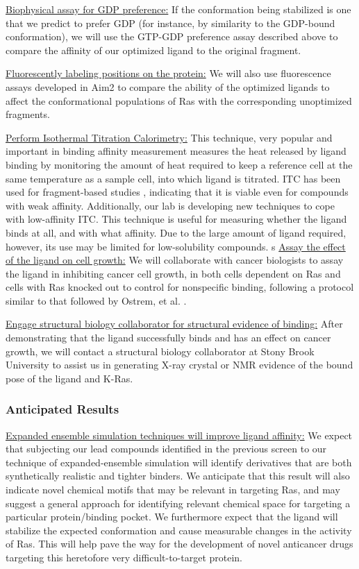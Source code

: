 \documentclass[12pt]{article}
\begin{document}
\underline{Biophysical assay for GDP preference:} If the conformation being stabilized is one that we predict to prefer GDP (for instance, by similarity to the GDP-bound conformation), we will use the GTP-GDP preference assay described above to compare the affinity of our optimized ligand to the original fragment.

\underline{Fluorescently labeling positions on the protein:} We will also use fluorescence assays developed in Aim2 to compare the ability of the optimized ligands to affect the conformational populations of Ras with the corresponding unoptimized fragments.

\underline{Perform Isothermal Titration Calorimetry:} This technique, very popular and important in binding affinity measurement \cite{itcref} measures the heat released by ligand binding by monitoring the amount of heat required to keep a reference cell at the same temperature as a sample cell, into which ligand is titrated. ITC has been used for fragment-based studies \cite{drinkwater2010}, indicating that it is viable even for compounds with weak affinity. Additionally, our lab is developing new techniques to cope with low-affinity ITC. This technique is useful for measuring whether the ligand binds at all, and with what affinity. Due to the large amount of ligand required, however, its use may be limited for low-solubility compounds.
s
\underline{Assay the effect of the ligand on cell growth:} We will collaborate with cancer biologists to assay the ligand in inhibiting cancer cell growth, in both cells dependent on Ras and cells with Ras knocked out to control for 
nonspecific binding, following a protocol similar to that followed by Ostrem, et al. \cite{ostrem2013}.

\underline{Engage structural biology collaborator for structural evidence of binding:} After demonstrating that the ligand successfully binds and has an effect on cancer growth, we will contact a structural biology collaborator at Stony Brook University to assist us in generating X-ray crystal or NMR evidence of the bound pose of the ligand and K-Ras.

\subsubsection*{Anticipated Results}

\underline{Expanded ensemble simulation techniques will improve ligand affinity:} We expect that subjecting our lead compounds identified in the previous screen to our technique of expanded-ensemble simulation will identify derivatives that are both synthetically realistic and tighter binders. We anticipate that this result will also indicate novel chemical motifs that may be relevant in targeting Ras, and may suggest a general approach for identifying relevant chemical space for targeting a particular protein/binding pocket. We furthermore expect that the ligand will stabilize the expected conformation and cause measurable changes in the activity of Ras. This will help pave the way for the development of novel anticancer drugs targeting this heretofore very difficult-to-target protein.
\end{document}
